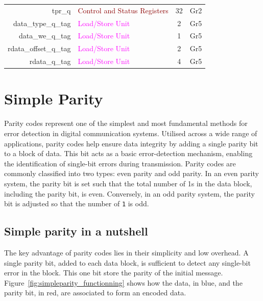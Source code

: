 \begin{table}
\begin{tabular}{rlcc}
        tpr\_q                          & \textcolor{DarkRed}{Control and Status Registers} & 32   & Gr2   \\\hdashline
        data\_type\_q\_tag              & \textcolor{magenta}{Load/Store Unit}              & 2    & Gr5   \\
        data\_we\_q\_tag                & \textcolor{magenta}{Load/Store Unit}              & 1    & Gr5   \\
        rdata\_offset\_q\_tag           & \textcolor{magenta}{Load/Store Unit}              & 2    & Gr5   \\
        rdata\_q\_tag                   & \textcolor{magenta}{Load/Store Unit}              & 4    & Gr5   \\
        \bottomrule
    \end{tabular}
\end{table}
    

\section{Simple Parity}
\label{chapter:simpleparity}

Parity codes represent one of the simplest and most fundamental methods for error detection in digital communication systems. Utilised across a wide range of applications, parity codes help ensure data integrity by adding a single parity bit to a block of data. This bit acts as a basic error-detection mechanism, enabling the identification of single-bit errors during transmission. Parity codes are commonly classified into two types: even parity and odd parity. In an even parity system, the parity bit is set such that the total number of 1s in the data block, including the parity bit, is even. Conversely, in an odd parity system, the parity bit is adjusted so that the number of \texttt{1} is odd.

\subsection{Simple parity in a nutshell}
The key advantage of parity codes lies in their simplicity and low overhead. A single parity bit, added to each data block, is sufficient to detect any single-bit error in the block. This one bit store the parity of the initial message. Figure~\ref{fig:simpleparity_functionning} shows how the data, in blue, and the parity bit, in red, are associated to form an encoded data.

